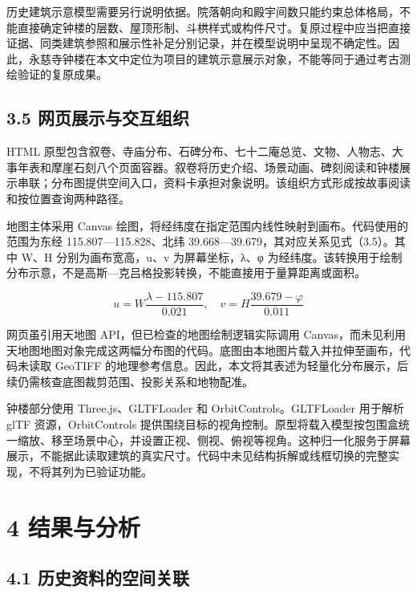 \documentclass[UTF8,a4paper,zihao=-4]{ctexart}
\begin{document}
历史建筑示意模型需要另行说明依据。院落朝向和殿宇间数只能约束总体格局，不能直接确定钟楼的层数、屋顶形制、斗栱样式或构件尺寸。复原过程中应当把直接证据、同类建筑参照和展示性补足分别记录，并在模型说明中呈现不确定性\cite{r5}。因此，永慈寺钟楼在本文中定位为项目的建筑示意展示对象，不能等同于通过考古测绘验证的复原成果。


\subsection*{3.5 网页展示与交互组织}

HTML 原型包含叙卷、寺庙分布、石碑分布、七十二庵总览、文物、人物志、大事年表和摩崖石刻八个页面容器。叙卷将历史介绍、场景动画、碑刻阅读和钟楼展示串联；分布图提供空间入口，资料卡承担对象说明。该组织方式形成按故事阅读和按位置查询两种路径。


地图主体采用 Canvas 绘图，将经纬度在指定范围内线性映射到画布。代码使用的范围为东经 115.807\textdegree{}—115.828\textdegree{}、北纬 39.668\textdegree{}—39.679\textdegree{}，其对应关系见式（3.5）。其中 W、H 分别为画布宽高，u、v 为屏幕坐标，λ、φ 为经纬度。该转换用于绘制分布示意，不是高斯—克吕格投影转换，不能直接用于量算距离或面积。


\begin{equation}u=W\frac{\lambda-115.807}{0.021},\quad v=H\frac{39.679-\varphi}{0.011}\tag{3.5}\end{equation}

网页虽引用天地图 API，但已检查的地图绘制逻辑实际调用 Canvas，而未见利用天地图地图对象完成这两幅分布图的代码。底图由本地图片载入并拉伸至画布，代码未读取 GeoTIFF 的地理参考信息。因此，本文将其表述为轻量化分布展示，后续仍需核查底图裁剪范围、投影关系和地物配准。


钟楼部分使用 Three.js、GLTFLoader 和 OrbitControls。GLTFLoader 用于解析 glTF 资源，OrbitControls 提供围绕目标的视角控制\cite{r8,r9}。原型将载入模型按包围盒统一缩放、移至场景中心，并设置正视、侧视、俯视等视角。这种归一化服务于屏幕展示，不能据此读取建筑的真实尺寸。代码中未见结构拆解或线框切换的完整实现，不将其列为已验证功能。


\section*{4 结果与分析}

\subsection*{4.1 历史资料的空间关联}
\end{document}
